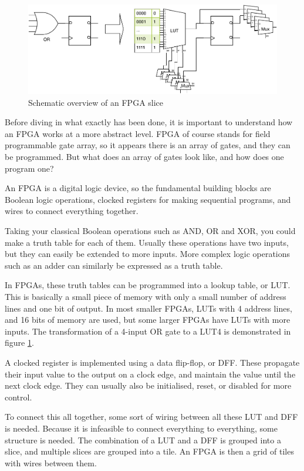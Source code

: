 \documentclass{article}
\begin{document}
\begin{figure}
    \centering
    \includegraphics[width=\textwidth]{fig/slice.pdf}
    \caption{Schematic overview of an FPGA slice}
    \label{fig:slice}
\end{figure}

Before diving in what exactly has been done, it is important to understand how an FPGA works at a more abstract level. FPGA of course stands for field programmable gate array, so it appears there is an array of gates, and they can be programmed. But what does an array of gates look like, and how does one program one?

An FPGA is a digital logic device, so the fundamental building blocks are Boolean logic operations, clocked registers for making sequential programs, and wires to connect everything together.

Taking your classical Boolean operations such as AND, OR and XOR, you could make a truth table for each of them. Usually these operations have two inputs, but they can easily be extended to more inputs. More complex logic operations such as an adder can similarly be expressed as a truth table.

In FPGAs, these truth tables can be programmed into a lookup table, or LUT. This is basically a small piece of memory with only a small number of address lines and one bit of output. In most smaller FPGAs, LUTs with 4 address lines, and 16 bits of memory are used, but some larger FPGAs have LUTs with more inputs. The transformation of a 4-input OR gate to a LUT4 is demonstrated in figure \ref{fig:slice}.

A clocked register is implemented using a data flip-flop, or DFF. These propagate their input value to the output on a clock edge, and maintain the value until the next clock edge. They can usually also be initialised, reset, or disabled for more control.

To connect this all together, some sort of wiring between all these LUT and DFF is needed. Because it is infeasible to connect everything to everything, some structure is needed. The combination of a LUT and a DFF is grouped into a slice, and multiple slices are grouped into a tile. An FPGA is then a grid of tiles with wires between them.
\end{document}
